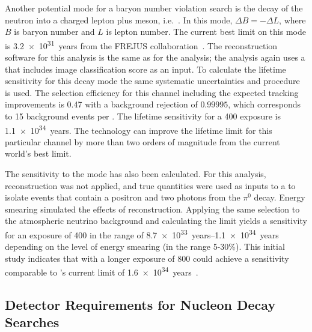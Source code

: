 Another potential mode for a baryon number violation search is the decay of the neutron into a charged lepton plus meson, i.e.~\ntoek. In this mode, $\Delta B = -\Delta L$, where $B$ is baryon number and $L$ is lepton number.  The current best limit on this mode is \SI{3.2e31}{years} from the FREJUS collaboration~\cite{Berger:1991fa}. The reconstruction software for this analysis is the same as for the \ptoknubar analysis; the analysis again uses a  that includes image classification score as an input. To calculate the lifetime sensitivity for this decay mode the same systematic uncertainties and procedure is used. The selection efficiency for this channel including the expected tracking improvements is \num{0.47}
with a background rejection of 
$0.99995$,
which corresponds to \num{15} background events per \si{\Mtyr}. The lifetime sensitivity for a \SI{400}{\ktyr} exposure is \SI{1.1e34}{years}. 
The   technology can improve the lifetime limit for this particular channel by more than two orders of magnitude from the current world's best limit.

The sensitivity to the \ptoepizero mode has also been calculated. For this analysis, reconstruction was not applied, and true quantities were used as inputs to a  to isolate events that contain a positron and two photons from the $\pi^0$ decay.  Energy smearing simulated the effects of reconstruction.  Applying the same selection to the atmospheric neutrino background and calculating the limit yields a sensitivity for an exposure of \SI{400}{\ktyr} in the range of \SIrange{8.7e33}{1.1e34}{years} depending on the level of energy smearing (in the range 5-30\%).  This initial study indicates that with a longer exposure of \SI{800}{\ktyr}  could achieve a sensitivity comparable to \superk's current limit of \SI{1.6e34}{years}~\cite{Miura:2016krn}.

\subsection{Detector Requirements for Nucleon Decay Searches}
\label{subsec:nonaccel-ndk-requirements}

